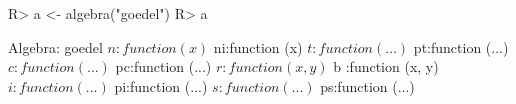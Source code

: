 \begin{Schunk}
% --begin: "goedel.algebra"
\begin{Sinput}
R> a <- algebra("goedel")
R> a
\end{Sinput}
\begin{Soutput}
Algebra: goedel 
 $ n :function (x)  
 $ ni:function (x)  
 $ t :function (...)  
 $ pt:function (...)  
 $ c :function (...)  
 $ pc:function (...)  
 $ r :function (x, y)  
 $ b :function (x, y)  
 $ i :function (...)  
 $ pi:function (...)  
 $ s :function (...)  
 $ ps:function (...)  
\end{Soutput}
%
% --end: "goedel.algebra"
\end{Schunk}
